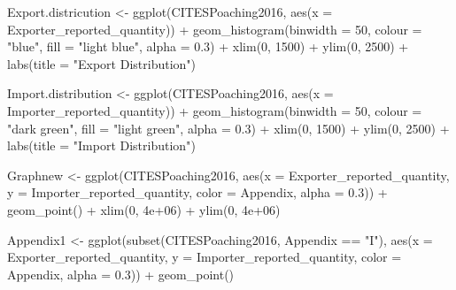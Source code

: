 \documentclass[
  12pt,
]{article}
\newenvironment{Shaded}{\begin{snugshade}}{\end{snugshade}}
\newcommand{\AttributeTok}[1]{\textcolor[rgb]{0.77,0.63,0.00}{#1}}
\newcommand{\DecValTok}[1]{\textcolor[rgb]{0.00,0.00,0.81}{#1}}
\newcommand{\FloatTok}[1]{\textcolor[rgb]{0.00,0.00,0.81}{#1}}
\newcommand{\FunctionTok}[1]{\textcolor[rgb]{0.00,0.00,0.00}{#1}}
\newcommand{\NormalTok}[1]{#1}
\newcommand{\OtherTok}[1]{\textcolor[rgb]{0.56,0.35,0.01}{#1}}
\newcommand{\SpecialCharTok}[1]{\textcolor[rgb]{0.00,0.00,0.00}{#1}}
\newcommand{\StringTok}[1]{\textcolor[rgb]{0.31,0.60,0.02}{#1}}
\begin{document}
\begin{Shaded}
\begin{Highlighting}[]
\NormalTok{Export.districution }\OtherTok{\textless{}{-}} \FunctionTok{ggplot}\NormalTok{(CITESPoaching2016, }\FunctionTok{aes}\NormalTok{(}\AttributeTok{x =}\NormalTok{ Exporter\_reported\_quantity)) }\SpecialCharTok{+}
    \FunctionTok{geom\_histogram}\NormalTok{(}\AttributeTok{binwidth =} \DecValTok{50}\NormalTok{, }\AttributeTok{colour =} \StringTok{"blue"}\NormalTok{, }\AttributeTok{fill =} \StringTok{"light blue"}\NormalTok{, }\AttributeTok{alpha =} \FloatTok{0.3}\NormalTok{) }\SpecialCharTok{+}
    \FunctionTok{xlim}\NormalTok{(}\DecValTok{0}\NormalTok{, }\DecValTok{1500}\NormalTok{) }\SpecialCharTok{+} \FunctionTok{ylim}\NormalTok{(}\DecValTok{0}\NormalTok{, }\DecValTok{2500}\NormalTok{) }\SpecialCharTok{+} \FunctionTok{labs}\NormalTok{(}\AttributeTok{title =} \StringTok{"Export Distribution"}\NormalTok{)}


\NormalTok{Import.distribution }\OtherTok{\textless{}{-}} \FunctionTok{ggplot}\NormalTok{(CITESPoaching2016, }\FunctionTok{aes}\NormalTok{(}\AttributeTok{x =}\NormalTok{ Importer\_reported\_quantity)) }\SpecialCharTok{+}
    \FunctionTok{geom\_histogram}\NormalTok{(}\AttributeTok{binwidth =} \DecValTok{50}\NormalTok{, }\AttributeTok{colour =} \StringTok{"dark green"}\NormalTok{, }\AttributeTok{fill =} \StringTok{"light green"}\NormalTok{, }\AttributeTok{alpha =} \FloatTok{0.3}\NormalTok{) }\SpecialCharTok{+}
    \FunctionTok{xlim}\NormalTok{(}\DecValTok{0}\NormalTok{, }\DecValTok{1500}\NormalTok{) }\SpecialCharTok{+} \FunctionTok{ylim}\NormalTok{(}\DecValTok{0}\NormalTok{, }\DecValTok{2500}\NormalTok{) }\SpecialCharTok{+} \FunctionTok{labs}\NormalTok{(}\AttributeTok{title =} \StringTok{"Import Distribution"}\NormalTok{)}


\NormalTok{Graphnew }\OtherTok{\textless{}{-}} \FunctionTok{ggplot}\NormalTok{(CITESPoaching2016, }\FunctionTok{aes}\NormalTok{(}\AttributeTok{x =}\NormalTok{ Exporter\_reported\_quantity, }\AttributeTok{y =}\NormalTok{ Importer\_reported\_quantity,}
    \AttributeTok{color =}\NormalTok{ Appendix, }\AttributeTok{alpha =} \FloatTok{0.3}\NormalTok{)) }\SpecialCharTok{+} \FunctionTok{geom\_point}\NormalTok{() }\SpecialCharTok{+} \FunctionTok{xlim}\NormalTok{(}\DecValTok{0}\NormalTok{, }\FloatTok{4e+06}\NormalTok{) }\SpecialCharTok{+} \FunctionTok{ylim}\NormalTok{(}\DecValTok{0}\NormalTok{, }\FloatTok{4e+06}\NormalTok{)}


\NormalTok{Appendix1 }\OtherTok{\textless{}{-}} \FunctionTok{ggplot}\NormalTok{(}\FunctionTok{subset}\NormalTok{(CITESPoaching2016, Appendix }\SpecialCharTok{==} \StringTok{"I"}\NormalTok{), }\FunctionTok{aes}\NormalTok{(}\AttributeTok{x =}\NormalTok{ Exporter\_reported\_quantity,}
    \AttributeTok{y =}\NormalTok{ Importer\_reported\_quantity, }\AttributeTok{color =}\NormalTok{ Appendix, }\AttributeTok{alpha =} \FloatTok{0.3}\NormalTok{)) }\SpecialCharTok{+} \FunctionTok{geom\_point}\NormalTok{()}



\end{Highlighting}
\end{Shaded}
\end{document}
